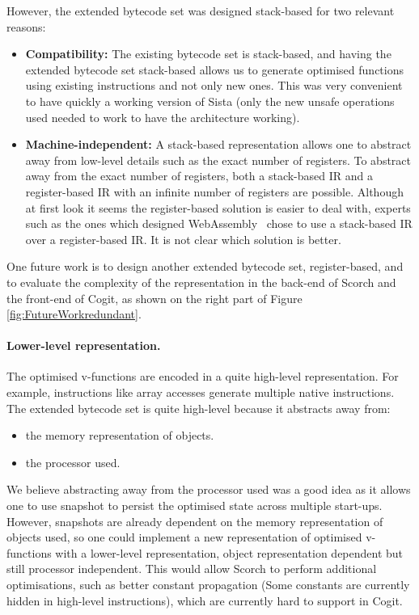 \documentclass[a4paper,12pt,twoside]{../includes/ThesisStyle}
\begin{document}
However, the extended bytecode set was designed stack-based for two relevant reasons:
\begin{itemize}
	\item \textbf{Compatibility:} The existing bytecode set is stack-based, and having the extended bytecode set stack-based allows us to generate optimised functions using existing instructions and not only new ones. This was very convenient to have quickly a working version of Sista (only the new unsafe operations used needed to work to have the architecture working).
	\item \textbf{Machine-independent:} A stack-based representation allows one to abstract away from low-level details such as the exact number of registers. To abstract away from the exact number of registers, both a stack-based IR and a register-based IR with an infinite number of registers are possible. 
	Although at first look it seems the register-based solution is easier to deal with, experts such as the ones which designed WebAssembly~\cite{WebAssembly} chose to use a stack-based IR over a register-based IR. It is not clear which solution is better.
\end{itemize}	 

One future work is to design another extended bytecode set, register-based, and to evaluate the complexity of the representation in the back-end of Scorch and the front-end of Cogit, as shown on the right part of Figure \ref{fig:FutureWorkredundant}.

\paragraph{Lower-level representation.}The optimised v-functions are encoded in a quite high-level representation. For example, instructions like array accesses generate multiple native instructions. The extended bytecode set is quite high-level because it abstracts away from:
\begin{itemize}
	\item the memory representation of objects.
	\item the processor used.
\end{itemize}

We believe abstracting away from the processor used was a good idea as it allows one to use snapshot to persist the optimised state across multiple start-ups. However, snapshots are already dependent on the memory representation of objects used, so one could implement a new representation of optimised v-functions with a lower-level representation, object representation dependent but still processor independent. This would allow Scorch to perform additional optimisations, such as better constant propagation (Some constants are currently hidden in high-level instructions), which are currently hard to support in Cogit.
\end{document}
